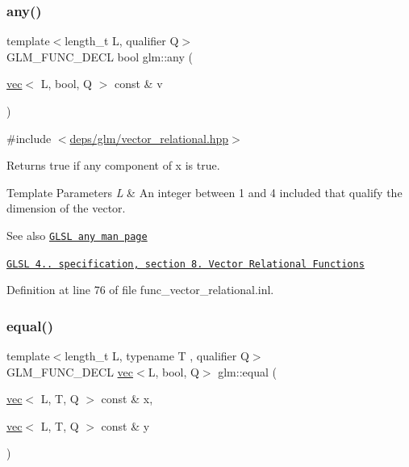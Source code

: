 \subsubsection{\texorpdfstring{any()}{any()}}
{\footnotesize\ttfamily template$<$length\+\_\+t L, qualifier Q$>$ \\
G\+L\+M\+\_\+\+F\+U\+N\+C\+\_\+\+D\+E\+CL bool glm\+::any (\begin{DoxyParamCaption}\item[{\hyperlink{structglm_1_1vec}{vec}$<$ L, bool, Q $>$ const \&}]{v }\end{DoxyParamCaption})}



{\ttfamily \#include $<$\hyperlink{vector__relational_8hpp}{deps/glm/vector\+\_\+relational.\+hpp}$>$}

Returns true if any component of x is true.


\begin{DoxyTemplParams}{Template Parameters}
{\em L} & An integer between 1 and 4 included that qualify the dimension of the vector.\\
\hline
\end{DoxyTemplParams}
\begin{DoxySeeAlso}{See also}
\href{http://www.opengl.org/sdk/docs/manglsl/xhtml/any.xml}{\tt G\+L\+SL any man page} 

\href{http://www.opengl.org/registry/doc/GLSLangSpec.4.20.8.pdf}{\tt G\+L\+SL 4.. specification, section 8. Vector Relational Functions} 
\end{DoxySeeAlso}


Definition at line 76 of file func\+\_\+vector\+\_\+relational.\+inl.

\mbox{\label{group__core__func__vector__relational_ga774f9e3a93c913f1e7c215a549707d59}} 
\subsubsection{\texorpdfstring{equal()}{equal()}}
{\footnotesize\ttfamily template$<$length\+\_\+t L, typename T , qualifier Q$>$ \\
G\+L\+M\+\_\+\+F\+U\+N\+C\+\_\+\+D\+E\+CL \hyperlink{structglm_1_1vec}{vec}$<$L, bool, Q$>$ glm\+::equal (\begin{DoxyParamCaption}\item[{\hyperlink{structglm_1_1vec}{vec}$<$ L, T, Q $>$ const \&}]{x,  }\item[{\hyperlink{structglm_1_1vec}{vec}$<$ L, T, Q $>$ const \&}]{y }\end{DoxyParamCaption})}



